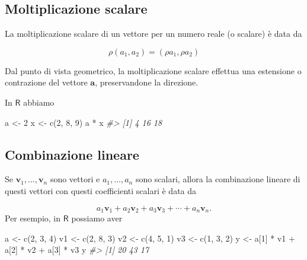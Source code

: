 \documentclass[
  11pt,
]{krantz}
\makeatletter
\newenvironment{Shaded}{\begin{snugshade}}{\end{snugshade}}
\newcommand{\CommentTok}[1]{\textcolor[rgb]{0.37,0.37,0.37}{\textit{#1}}}
\newcommand{\DecValTok}[1]{\textcolor[rgb]{0.06,0.06,0.06}{#1}}
\newcommand{\FunctionTok}[1]{\textcolor[rgb]{0,0,0}{#1}}
\newcommand{\NormalTok}[1]{#1}
\newcommand{\OtherTok}[1]{\textcolor[rgb]{0.37,0.37,0.37}{#1}}
\newcommand{\SpecialCharTok}[1]{\textcolor[rgb]{0,0,0}{#1}}
\newenvironment{kframe}{%
\medskip{}
\setlength{\fboxsep}{.8em}
 \def\at@end@of@kframe{}%
 \ifinner\ifhmode%
  \def\at@end@of@kframe{\end{minipage}}%
  \begin{minipage}{\columnwidth}%
 \fi\fi%
 \def\FrameCommand##1{\hskip\@totalleftmargin \hskip-\fboxsep
 \colorbox{shadecolor}{##1}\hskip-\fboxsep
     \hskip-\linewidth \hskip-\@totalleftmargin \hskip\columnwidth}%
 \MakeFramed {\advance\hsize-\width
   \@totalleftmargin\z@ \linewidth\hsize
   \@setminipage}}%
 {\par\unskip\endMakeFramed%
 \at@end@of@kframe}
\renewenvironment{Shaded}{\begin{kframe}}{\end{kframe}}
\theoremstyle{definition}
\theoremstyle{definition}
\theoremstyle{definition}
\theoremstyle{definition}
\theoremstyle{remark}
\makeatother
\begin{document}
\hypertarget{moltiplicazione-scalare}{%
\subsection{Moltiplicazione scalare}\label{moltiplicazione-scalare}}

La moltiplicazione scalare di un vettore per un numero reale (o scalare) è data da

\[
\rho (a_1, a_2) = (\rho a_1, \rho a_2)
\]

Dal punto di vista geometrico, la moltiplicazione scalare effettua una estensione o contrazione del vettore \(\boldsymbol{a}\), preservandone la direzione.

In \(\mathsf{R}\) abbiamo

\begin{Shaded}
\begin{Highlighting}[]
\NormalTok{a }\OtherTok{\textless{}{-}} \DecValTok{2}
\NormalTok{x }\OtherTok{\textless{}{-}} \FunctionTok{c}\NormalTok{(}\DecValTok{2}\NormalTok{, }\DecValTok{8}\NormalTok{, }\DecValTok{9}\NormalTok{)}
\NormalTok{a }\SpecialCharTok{*}\NormalTok{ x}
\CommentTok{\#\textgreater{} [1]  4 16 18}
\end{Highlighting}
\end{Shaded}

\hypertarget{combinazione-lineare}{%
\subsection{Combinazione lineare}\label{combinazione-lineare}}

Se \(\mathbf{v}_{1}, \dots, \mathbf{v}_{n}\) sono vettori e \(a_1, \dots, a_n\) sono scalari, allora la combinazione lineare di questi vettori con questi coefficienti scalari è data da

\[
{\displaystyle a_{1}\mathbf {v} _{1}+a_{2}\mathbf {v} _{2}+a_{3}\mathbf {v} _{3}+\cdots +a_{n}\mathbf {v} _{n}.}
\] Per esempio, in \(\mathsf{R}\) possiamo aver

\begin{Shaded}
\begin{Highlighting}[]
\NormalTok{a }\OtherTok{\textless{}{-}} \FunctionTok{c}\NormalTok{(}\DecValTok{2}\NormalTok{, }\DecValTok{3}\NormalTok{, }\DecValTok{4}\NormalTok{)}
\NormalTok{v1 }\OtherTok{\textless{}{-}} \FunctionTok{c}\NormalTok{(}\DecValTok{2}\NormalTok{, }\DecValTok{8}\NormalTok{, }\DecValTok{3}\NormalTok{)}
\NormalTok{v2 }\OtherTok{\textless{}{-}} \FunctionTok{c}\NormalTok{(}\DecValTok{4}\NormalTok{, }\DecValTok{5}\NormalTok{, }\DecValTok{1}\NormalTok{)}
\NormalTok{v3 }\OtherTok{\textless{}{-}} \FunctionTok{c}\NormalTok{(}\DecValTok{1}\NormalTok{, }\DecValTok{3}\NormalTok{, }\DecValTok{2}\NormalTok{)}
\NormalTok{y }\OtherTok{\textless{}{-}}\NormalTok{ a[}\DecValTok{1}\NormalTok{] }\SpecialCharTok{*}\NormalTok{ v1 }\SpecialCharTok{+}\NormalTok{ a[}\DecValTok{2}\NormalTok{] }\SpecialCharTok{*}\NormalTok{ v2 }\SpecialCharTok{+}\NormalTok{ a[}\DecValTok{3}\NormalTok{] }\SpecialCharTok{*}\NormalTok{ v3}
\NormalTok{y}
\CommentTok{\#\textgreater{} [1] 20 43 17}
\end{Highlighting}
\end{Shaded}
\end{document}
